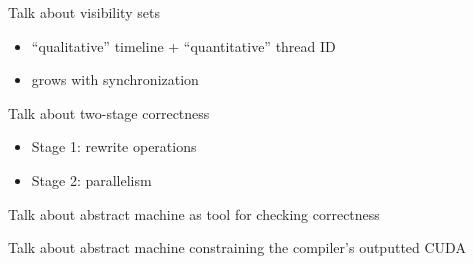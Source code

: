 {\LARGE

Talk about visibility sets
\begin{itemize}
  \item ``qualitative'' timeline + ``quantitative'' thread ID
  \item grows with synchronization
\end{itemize}

Talk about two-stage correctness
\begin{itemize}
  \item Stage 1: rewrite operations
  \item Stage 2: parallelism
\end{itemize}

Talk about abstract machine as tool for checking correctness

Talk about abstract machine constraining the compiler's outputted CUDA

}


